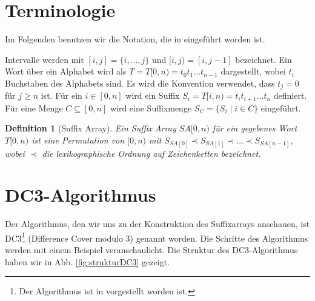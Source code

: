 \documentclass[12pt]{report}
\newtheorem{definition}{Definition}
\begin{document}
\section{Terminologie}
\label{sec:Terminologie}
Im Folgenden benutzen wir die Notation, die in \cite{Karkkainen2006} eingeführt worden ist.

Intervalle werden mit $[i,j] = \{ i, \dots, j\}$ und $[i,j) = [i,j-1]$ bezeichnet. Ein Wort über ein Alphabet wird als $T = T[0,n) = t_0 t_1 \dots t_{n-1}$ dargestellt, wobei $t_i$ Buchstaben des Alphabets sind. Es wird die Konvention verwendet, dass $t_j = 0$ für $j \ge n$ ist. Für ein $i \in [0,n]$ wird ein Suffix $S_i = T[i,n) = t_i t_{i+1} \dots t_n$ definiert. Für eine Menge $C \subseteq [0,n]$ wird eine Suffixmenge $S_C = \{ S_i \mid i \in C\}$ eingeführt.

\begin{definition}[Suffix Array]
Ein Suffix Array $SA[0,n)$ für ein gegebenes Wort $T[0,n)$ ist eine Permutation von $[0,n)$ mit $S_{SA[0]} \prec S_{SA[1]} \prec \dots \prec S_{SA[n-1]}$, wobei $\prec$ die lexikographische Ordnung auf Zeichenketten bezeichnet.
\end{definition}

\section{DC3-Algorithmus}
\label{sec:DC3Algorithmus}

Der Algorithmus, den wir uns zu der Konstruktion des Suffixarrays anschauen, ist DC3\footnote{Der Algorithmus ist in \cite{Karkkainen2006} vorgestellt worden ist.} (Difference Cover modulo 3) genannt worden. Die Schritte des Algorithmus werden mit einem Beispiel veranschaulicht. Die Struktur des DC3-Algorithmus haben wir in Abb. \ref{fig:strukturDC3} gezeigt.
\end{document}
